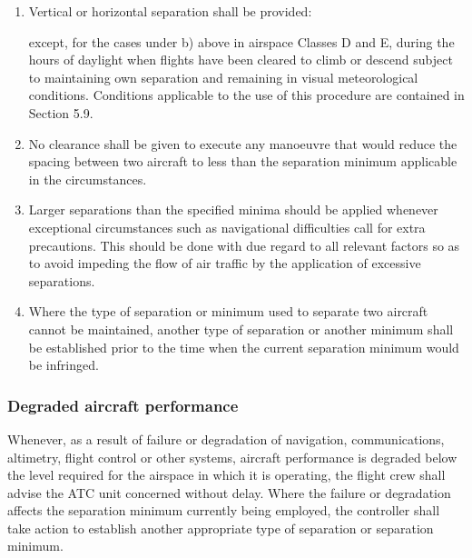 \begin{enumerate}
    \item Vertical or horizontal separation shall be provided:

    \noindent except, for the cases under b) above in airspace Classes D and E, during the hours of daylight when flights have been cleared to climb or descend subject to maintaining own separation and remaining in visual meteorological conditions. Conditions applicable to the use of this procedure are contained in Section 5.9.
    \item No clearance shall be given to execute any manoeuvre that would reduce the spacing between two aircraft to less than the separation minimum applicable in the circumstances.
    \item Larger separations than the specified minima should be applied whenever exceptional circumstances such as navigational difficulties call for extra precautions. This should be done with due regard to all relevant factors so as to avoid impeding the flow of air traffic by the application of excessive separations.
    \item Where the type of separation or minimum used to separate two aircraft cannot be maintained, another type of separation or another minimum shall be established prior to the time when the current separation minimum would be infringed.
\end{enumerate}

\subsubsection{Degraded aircraft performance}

Whenever, as a result of failure or degradation of navigation, communications, altimetry, flight control or other systems, aircraft performance is degraded below the level required for the airspace in which it is operating, the flight crew shall advise the ATC unit concerned without delay. Where the failure or degradation affects the separation minimum currently being employed, the controller shall take action to establish another appropriate type of separation or separation minimum.

